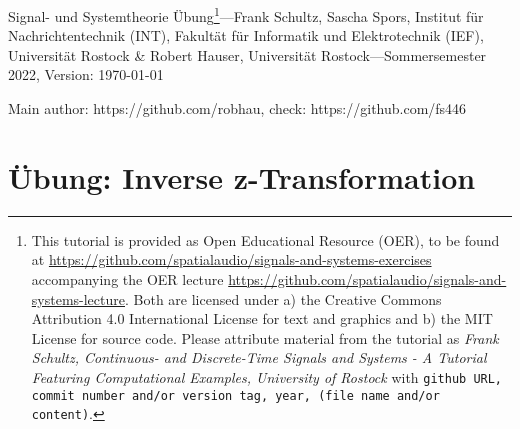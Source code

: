 \documentclass[11pt,a4paper,DIV=12]{scrartcl}
\begin{document}
%
\noindent Signal- und Systemtheorie Übung\footnote{This tutorial is provided as
Open Educational Resource (OER), to be found at
\url{https://github.com/spatialaudio/signals-and-systems-exercises}
accompanying the OER lecture
\url{https://github.com/spatialaudio/signals-and-systems-lecture}.
%
Both are licensed under a) the Creative Commons Attribution 4.0 International
License for text and graphics and b) the MIT License for source code.
%
Please attribute material from the tutorial as \textit{Frank Schultz,
Continuous- and Discrete-Time Signals and Systems - A Tutorial Featuring
Computational Examples, University of Rostock} with
\texttt{github URL, commit number and/or version tag, year, (file name and/or
content)}.}---Frank Schultz, Sascha Spors,
Institut für Nachrichtentechnik (INT),
Fakultät für Informatik und Elektrotechnik (IEF),
Universität Rostock \&
Robert Hauser, Universität Rostock---Sommersemester 2022, Version: \today

\noindent Main author: https://github.com/robhau, check: https://github.com/fs446

\tableofcontents

\section{Übung: Inverse z-Transformation}

\end{document}
